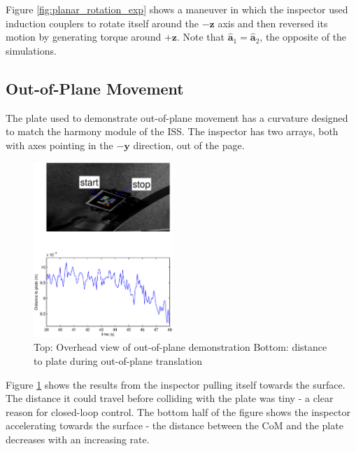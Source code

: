 \documentclass[letterpaper, 10 pt, conference]{ieeeconf}  %
\begin{document}
  \par Figure \ref{fig:planar_rotation_exp} shows a maneuver in which the inspector used induction couplers to rotate itself around the $-\textbf{z}$ axis and then reversed its motion by generating torque around $+\textbf{z}$.  Note that $\hat{\textbf{a}}_1 =  \hat{\textbf{a}}_2$, the opposite of the simulations.

     \subsection{Out-of-Plane Movement}\label{sec:oop_movement_exp}
     
     The plate used to demonstrate out-of-plane movement has a curvature designed to match the harmony module of the ISS. The inspector has two arrays, both with axes pointing in the $-\textbf{y}$ direction, out of the page.  
         \begin{figure}[thpb]
      \centering
      \includegraphics[width = 0.47\textwidth]{figures/oop_translation.eps}
      \caption{Top: Overhead view of out-of-plane demonstration Bottom: distance to plate during out-of-plane translation}
      \label{fig:oop_translation_exp}
   \end{figure}
   
   \par Figure \ref{fig:oop_translation_exp} shows the results from the inspector pulling itself towards the surface. The distance it could travel before colliding with the plate was tiny - a clear reason for closed-loop control. The bottom half of the figure shows the inspector accelerating towards the surface - the distance between the CoM and the plate decreases with an increasing rate. 
  
\end{document}

